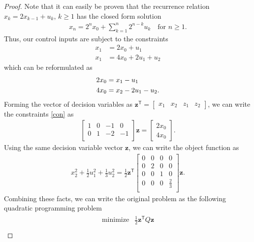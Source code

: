 \documentclass[12pt]{article}
\theoremstyle{definition}
\newcommand{\vc}[1]{\boldsymbol{#1}}
\newcommand{\tran}{\mathsf{T}}
\begin{document}
\begin{proof}
  Note that it can easily be proven that the recurrence relation
  $x_k = 2 x_{k-1} + u_k$, $k \geq 1$ has the closed form solution
  \begin{align*}
    x_n = 2^n x_0 + \sum_{k=1}^n 2^{n-k} u_k \quad \text{for $n\geq 1$}.
  \end{align*}
  Thus, our control inputs are subject to the constraints
  \begin{align*}
    x_1 &= 2x_0 + u_1 \\
    x_1 &= 4x_0 + 2u_1 + u_2
  \end{align*}
  which can be reformulated as
  \begin{align}\label{con}
    2x_0 &= x_1 - u_1 \notag \\
    4x_0 &= x_2 - 2u_1 - u_2.
  \end{align}
  Forming the vector of decision variables as $\vc{z}^\tran = \begin{bmatrix}x_1 & x_2 & z_1 & z_2\end{bmatrix}$,
  we can write the constraints \eqref{con} as
  \begin{align*}
    \begin{bmatrix}
      1 & 0 & -1 & 0 \\
      0 & 1 & -2 & -1 \\
    \end{bmatrix}
    \vc{z}
    =
    \begin{bmatrix}
      2 x_0 \\
      4 x_0
    \end{bmatrix}.
  \end{align*}
  Using the same decision variable vector $\vc{z}$, we can write the object function
  as
  \begin{align*}
    x_2^2 + \frac{1}{2}u_1^2+ \frac{1}{3}u_2^2
    = \frac{1}{2}\vc{z}^\tran
    \begin{bmatrix}
      0 & 0 & 0 & 0 \\
      0 & 2 & 0 & 0 \\
      0 & 0 & 1 & 0 \\
      0 & 0 & 0 & \frac{2}{3} \\
   \end{bmatrix}\vc{z}.
  \end{align*}
  Combining these facts, we can write the original problem as the following
  quadratic programming problem
  \begin{align}\label{quad_prob}
    \begin{array}{rl}
      \text{minimize} & \frac{1}{2} \vc{z}^\tran Q \vc{z}\\

\end{array}
\end{align}
\end{proof}
\end{document}

